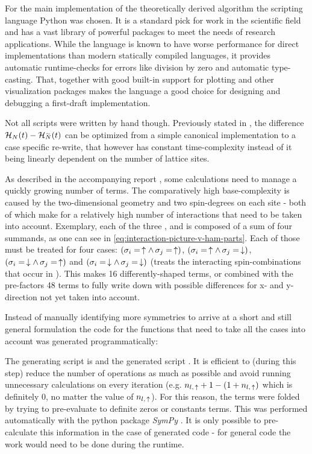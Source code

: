 For the main implementation of the theoretically derived algorithm the scripting language Python was chosen.
It is a standard pick for work in the scientific field and has a vast library of powerful packages to meet the needs of research applications.
While the language is known to have worse performance for direct implementations than modern statically compiled languages, it provides automatic runtime-checks for errors like division by zero and automatic type-casting.
That, together with good built-in support for plotting and other visualization packages makes the language a good choice for designing and debugging a first-draft implementation.

Not all scripts were written by hand though.
Previously stated in , the difference $\HNOft - \HNOft[\vphantom{N}\smash{\tilde{N}}]$ can be optimized from a simple canonical implementation to a case specific re-write, that however has constant time-complexity instead of it being linearly dependent on the number of lattice sites.

As described in the accompanying report , some calculations need to manage a quickly growing number of terms.
The comparatively high base-complexity is caused by the two-dimensional geometry and two spin-degrees on each site - both of which make for a relatively high number of interactions that need to be taken into account.
Exemplary, each of the three ,  and  is composed of a sum of four summands, as one can see in \autoref{eq:interaction-picture-v-ham-parts}.
Each of those must be treated for four cases: $(\sigma_i = \,\uparrow \land \,\sigma_j = \,\uparrow)$, $(\sigma_i = \,\uparrow \land \,\sigma_j = \,\downarrow)$, $(\sigma_i = \,\downarrow \land \,\sigma_j = \,\uparrow)$ and $(\sigma_i = \,\downarrow \land \,\sigma_j = \,\downarrow)$ (treats the interacting spin-combinations that occur in ).
This makes 16 differently-shaped terms, or combined with the pre-factors 48 terms to fully write down with possible differences for x- and y-direction not yet taken into account.

Instead of manually identifying more symmetries to arrive at a short and still general formulation the code for the functions that need to take all the cases into account was generated programmatically:

The generating script is  and the generated script .
It is efficient to (during this step) reduce the number of operations as much as possible and avoid running unnecessary calculations on every iteration (e.g. $n_{l,\,\uparrow} + 1 - (1 + n_{l,\,\uparrow})$ which is definitely 0, no matter the value of $n_{l,\,\uparrow}$).
For this reason, the terms were folded by trying to pre-evaluate to definite zeros or constants terms.
This was performed automatically with the python package \emph{SymPy} \cite{sympyPackage}.
It is only possible to pre-calculate this information in the case of generated code - for general code the work would need to be done during the runtime.
